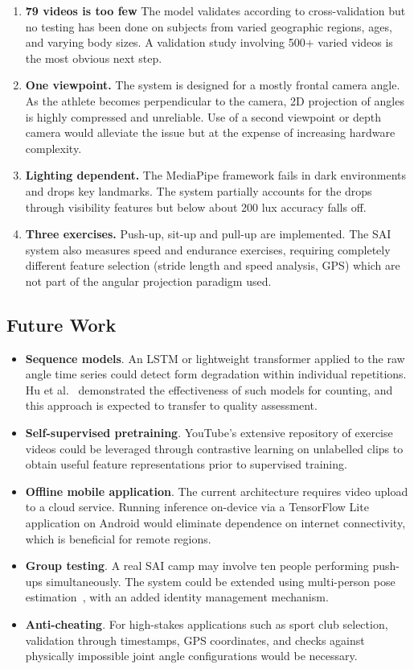 \documentclass[conference]{IEEEtran}
\begin{document}
\begin{enumerate}
    \item \textbf{79 videos is too few} The model validates according to cross-validation but no testing has been done on subjects from varied geographic regions, ages, and varying body sizes. A validation study involving 500+ varied videos is the most obvious next step.
 \item \textbf{One viewpoint.} The system is designed for a mostly frontal camera angle. As the athlete becomes perpendicular to the camera, 2D projection of angles is highly compressed and unreliable. Use of a second viewpoint or depth camera would alleviate the issue but at the expense of increasing hardware complexity.
 \item \textbf{Lighting dependent.} The MediaPipe framework fails in dark environments and drops key landmarks. The system partially accounts for the drops through visibility features but below about 200 lux accuracy falls off.
 \item \textbf{Three exercises.} Push-up, sit-up and pull-up are implemented. The SAI system also measures speed and endurance exercises, requiring completely different feature selection (stride length and speed analysis, GPS) which are not part of the angular projection paradigm used.
\end{enumerate}

\subsection{Future Work}

\begin{itemize}
     \item \textbf{Sequence models}. An LSTM or lightweight transformer applied to the raw angle time series could detect form degradation within individual repetitions. Hu et al.~\cite{hu2022} demonstrated the effectiveness of such models for counting, and this approach is expected to transfer to quality assessment.
 \item \textbf{Self-supervised pretraining}. YouTube's extensive repository of exercise videos could be leveraged through contrastive learning on unlabelled clips to obtain useful feature representations prior to supervised training.
 \item \textbf{Offline mobile application}. The current architecture requires video upload to a cloud service. Running inference on-device via a TensorFlow Lite application on Android would eliminate dependence on internet connectivity, which is beneficial for remote regions.
 \item \textbf{Group testing}. A real SAI camp may involve ten people performing push-ups simultaneously. The system could be extended using multi-person pose estimation~\cite{rtmpose2023}, with an added identity management mechanism.
 \item \textbf{Anti-cheating}. For high-stakes applications such as sport club selection, validation through timestamps, GPS coordinates, and checks against physically impossible joint angle configurations would be necessary.
\end{itemize}
\end{document}
